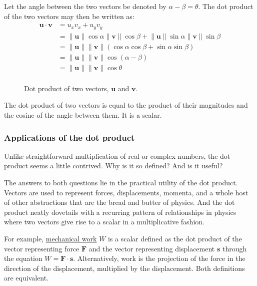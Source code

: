 \documentclass[
  a4paper,
]{article}
\begin{document}
Let the angle between the two vectors be denoted by
\(\alpha - \beta = \theta\). The dot product of the two vectors may then
be written as: \[
\begin{aligned}
\mathbf{u} \cdot \mathbf{v} &= u_{x}v_{x} + u_{y}v_{y}\\
&= \lVert\mathbf{u}\rVert\cos\alpha\lVert\mathbf{v}\rVert\cos\beta + \lVert\mathbf{u}\rVert\sin\alpha\lVert\mathbf{v}\rVert\sin\beta\\
&= \lVert\mathbf{u}\rVert\lVert\mathbf{v}\rVert(\cos\alpha\cos\beta + \sin\alpha\sin\beta)\\
&= \lVert\mathbf{u}\rVert\lVert\mathbf{v}\rVert\cos(\alpha - \beta)\\
&= \lVert\mathbf{u}\rVert\lVert\mathbf{v}\rVert\cos\theta\\
\end{aligned}
\]

\begin{figure}
\hypertarget{fig:dot-product}{%
\centering

\caption{Dot product of two vectors, \(\mathbf{u}\) and
\(\mathbf{v}\).}\label{fig:dot-product}
}
\end{figure}

The dot product of two vectors is equal to the product of their
magnitudes and the cosine of the angle between them. It is a scalar.

\hypertarget{applications-of-the-dot-product}{%
\subsubsection{Applications of the dot
product}\label{applications-of-the-dot-product}}

Unlike straightforward multiplication of real or complex numbers, the
dot product seems a little contrived. Why is it so defined? And is it
useful?

The answers to both questions lie in the practical utility of the dot
product. Vectors are used to represent forces, displacements, momenta,
and a whole host of other abstractions that are the bread and butter of
physics. And the dot product neatly dovetails with a recurring pattern
of relationships in physics where two vectors give rise to a scalar in a
multiplicative fashion.

For example,
\href{https://en.wikipedia.org/wiki/Work_\%28physics\%29}{mechanical
work} \(W\) is a scalar defined as the dot product of the vector
representing force \(\mathbf{F}\) and the vector representing
displacement \(\mathbf{s}\) through the equation
\(W = \mathbf{F}\cdot\mathbf{s}\). Alternatively, work is the projection
of the force in the direction of the displacement, multiplied by the
displacement. Both definitions are equivalent.
\end{document}
